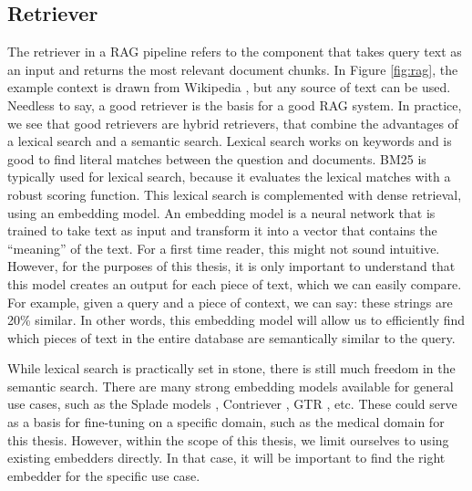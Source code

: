 \subsection{Retriever}
The retriever in a RAG pipeline refers to the component that takes query text as an input and returns the most relevant document chunks. In Figure \ref{fig:rag}, the example context is drawn from Wikipedia \cite{eiffel_wikipedia}, but any source of text can be used. Needless to say, a good retriever is the basis for a good RAG system. In practice, we see that good retrievers are hybrid retrievers, that combine the advantages of a lexical search and a semantic search. Lexical search works on keywords and is good to find literal matches between the question and documents. BM25 \cite{robertson2009probabilistic} is typically used for lexical search, because it evaluates the lexical matches with a robust scoring function. This lexical search is complemented with dense retrieval, using an embedding model. An embedding model is a neural network that is trained to take text as input and transform it into a vector that contains the ``meaning'' of the text. For a first time reader, this might not sound intuitive. However, for the purposes of this thesis, it is only important to understand that this model creates an output for each piece of text, which we can easily compare. For example, given a query and a piece of context, we can say: these strings are 20\% similar. In other words, this embedding model will allow us to efficiently find which pieces of text in the entire database are semantically similar to the query. 

While lexical search is practically set in stone, there is still much freedom in the semantic search. There are many strong embedding models available for general use cases, such as the Splade models \cite{formal2021splade, formal2021spladev2, lassance2024spladev3}, Contriever \cite{izacard2021unsupervisedcontriever}, GTR \cite{ni2021largegtr}, etc. These could serve as a basis for fine-tuning on a specific domain, such as the medical domain for this thesis. However, within the scope of this thesis, we limit ourselves to using existing embedders directly. In that case, it will be important to find the right embedder for the specific use case.

